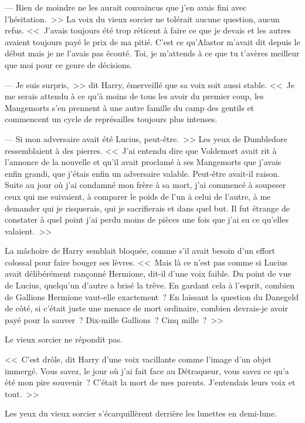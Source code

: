 --- Rien de moindre ne les aurait convaincus que j'en avais fini avec l'hésitation.~>> La voix du vieux sorcier ne tolérait aucune question, aucun refus. <<~J'avais toujours été trop réticent à faire ce que je devais et les autres avaient toujours payé le prix de ma pitié. C'est ce qu'Alastor m'avait dit depuis le début mais je ne l'avais pas écouté. Toi, je m'attends à ce que tu t'avères meilleur que moi pour ce genre de décisions.

--- Je suis surpris,~>> dit Harry, émerveillé que sa voix soit aussi stable. <<~Je me serais attendu à ce qu'à moins de tous les avoir du premier coup, les Mangemorts s'en prennent à une autre famille du camp des gentils et commencent un cycle de représailles toujours plus intenses.

--- Si mon adversaire avait été Lucius, peut-être.~>> Les yeux de Dumbledore ressemblaient à des pierres. <<~J'ai entendu dire que Voldemort avait rit à l'annonce de la nouvelle et qu'il avait proclamé à ses Mangemorts que j'avais enfin grandi, que j'étais enfin un adversaire valable. Peut-être avait-il raison. Suite au jour où j'ai condamné mon frère à sa mort, j'ai commencé à soupeser ceux qui me suivaient, à comparer le poids de l'un à celui de l'autre, à me demander qui je risquerais, qui je sacrifierais et dans quel but. Il fut étrange de constater à quel point j'ai perdu moins de pièces une fois que j'ai su ce qu'elles valaient.~>>

La mâchoire de Harry semblait bloquée, comme s'il avait besoin d'un effort colossal pour faire bouger ses lèvres. <<~Mais là ce n'est pas comme si Lucius avait délibérément rançonné Hermione, dit-il d'une voix faible. Du point de vue de Lucius, quelqu'un d'autre a brisé la trêve. En gardant cela à l'esprit, combien de Gallions Hermione vaut-elle exactement~? En laissant la question du Danegeld de côté, si c'était juste une menace de mort ordinaire, combien devrais-je avoir payé pour la sauver~? Dix-mille Gallions~? Cinq mille~?~>>

Le vieux sorcier ne répondit pas.

<<~C'est drôle, dit Harry d'une voix vacillante comme l'image d'un objet immergé. Vous savez, le jour où j'ai fait face au Détraqueur, vous savez ce qu'a été mon pire souvenir~? C'était la mort de mes parents. J'entendais leurs voix et tout.~>>

Les yeux du vieux sorcier s'écarquillèrent derrière les lunettes en demi-lune.

